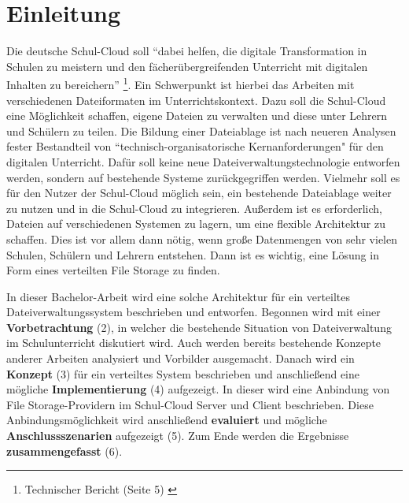 \section{Einleitung}
\label{sec:intro}

Die deutsche Schul-Cloud soll ``dabei helfen, die digitale Transformation in Schulen zu meistern und den fächerübergreifenden Unterricht mit digitalen Inhalten zu bereichern'' \footnote{ Technischer Bericht (Seite 5) \cite{paper:technischerbericht}}. Ein Schwerpunkt ist hierbei das Arbeiten mit verschiedenen Dateiformaten im Unterrichtskontext. Dazu soll die Schul-Cloud eine Möglichkeit schaffen, eigene Dateien zu verwalten und diese unter Lehrern und Schülern zu teilen. Die Bildung einer Dateiablage ist nach neueren Analysen fester Bestandteil von ``technisch-organisatorische Kernanforderungen" \cite{paper:breiterstolpmannzeising2015} für den digitalen Unterricht. Dafür soll keine neue Dateiverwaltungstechnologie entworfen werden, sondern auf bestehende Systeme zurückgegriffen werden. Vielmehr soll es für den Nutzer der Schul-Cloud möglich sein, ein bestehende Dateiablage weiter zu nutzen und in die Schul-Cloud zu integrieren. Außerdem ist es erforderlich, Dateien auf verschiedenen Systemen zu lagern, um eine flexible Architektur zu schaffen. Dies ist vor allem dann nötig, wenn große Datenmengen von sehr vielen Schulen, Schülern und Lehrern entstehen. Dann ist es wichtig, eine Lösung in Form eines verteilten File Storage zu finden. 

In dieser Bachelor-Arbeit wird eine solche Architektur für ein verteiltes Dateiverwaltungssystem beschrieben und entworfen. Begonnen wird mit einer \textbf{Vorbetrachtung} (2), in welcher die bestehende Situation von Dateiverwaltung im Schulunterricht diskutiert wird. Auch werden bereits bestehende Konzepte anderer Arbeiten analysiert und Vorbilder ausgemacht. Danach wird ein \textbf{Konzept} (3) für ein verteiltes System beschrieben und anschließend eine mögliche \textbf{Implementierung} (4)  aufgezeigt. In dieser wird eine Anbindung von File Storage-Providern im Schul-Cloud Server und Client beschrieben. Diese Anbindungsmöglichkeit wird anschließend \textbf{evaluiert} und mögliche \textbf{Anschlussszenarien} aufgezeigt (5). Zum Ende werden die Ergebnisse \textbf{zusammengefasst} (6).

\clearpage
